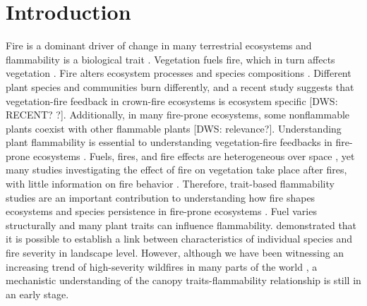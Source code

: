 \documentclass[12pt]{report}
\begin{document}
\section{Introduction}

Fire is a dominant driver of change in many terrestrial ecosystems and flammability is a biological trait \citep{pausas2012flammability}. Vegetation fuels fire, which in turn affects vegetation \citep{bar2019fire}. Fire alters ecosystem processes \citep{debano1978effect, debano1998fire, grogan2000fire,wan2001fire, keane2008ecological, roces2022global,ojima1994long} and species compositions \citep{cochrane2003fire,cleary2004changes, laurance2003slow}. Different plant species and communities burn differently, and a recent study suggests that vegetation-fire feedback in crown-fire ecosystems is ecosystem specific \citep{pausas2004plant} [DWS: RECENT?  ?]. Additionally, in many fire-prone ecosystems, some nonflammable plants coexist with other flammable plants \citep{pausas2012fire, pausas2017flammability} [DWS: relevance?]. Understanding plant flammability is essential to understanding vegetation-fire feedbacks in fire-prone ecosystems \citep{pausas2012fire, pausas2017flammability}. Fuels, fires, and fire effects are heterogeneous over space \citep{gagnon2010does}, yet many studies investigating the effect of fire on vegetation take place after fires, with little information on fire behavior \citep{o2018advances}. Therefore, trait-based flammability studies are an important contribution to understanding how fire shapes ecosystems and species persistence in fire-prone ecosystems \citep{pausas2012fire, pausas2017flammability}. Fuel varies structurally and many plant traits can influence flammability. \citet{schwilk2011scaling} demonstrated that it is possible to establish a link between characteristics of individual species  and fire severity in landscape level. However, although we have been witnessing an increasing trend of high-severity wildfires in many parts of the world \citep{miller2012trends, dennison2014large, weber2020spatiotemporal, salguero2020wildfire}, a mechanistic understanding of the canopy traits-flammability relationship is still in an early stage.
\end{document}
